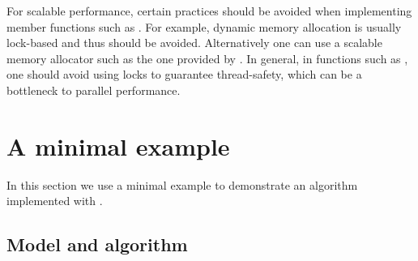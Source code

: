 For scalable performance, certain practices should be avoided when
implementing member functions such as . For example,
dynamic memory allocation is usually lock-based and thus should be avoided.
Alternatively one can use a scalable memory allocator such as the one provided
by \tbb. In general, in functions such as , one should
avoid using locks to guarantee thread-safety, which can be a bottleneck to
parallel performance.

\section{A minimal example}
\label{sec:A minimal example}

In this section we use a minimal example to demonstrate an \smc algorithm
implemented with \vsmc.

\subsection{Model and algorithm}
\label{sub:Model and algorithm}

